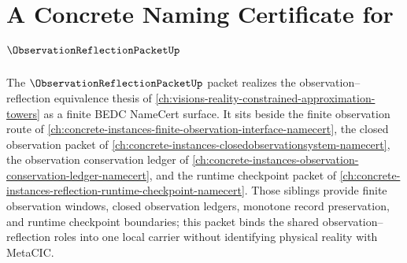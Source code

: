 \chapter{A Concrete Naming Certificate for $\ObservationReflectionPacketUp$}
\label{ch:concrete-instances-observationreflectionpacket-namecert}

The $\ObservationReflectionPacketUp$ packet realizes the observation--reflection equivalence thesis of \autoref{ch:visions-reality-constrained-approximation-towers} as a finite BEDC NameCert surface. It sits beside the finite observation route of \autoref{ch:concrete-instances-finite-observation-interface-namecert}, the closed observation packet of \autoref{ch:concrete-instances-closedobservationsystem-namecert}, the observation conservation ledger of \autoref{ch:concrete-instances-observation-conservation-ledger-namecert}, and the runtime checkpoint packet of \autoref{ch:concrete-instances-reflection-runtime-checkpoint-namecert}. Those siblings provide finite observation windows, closed observation ledgers, monotone record preservation, and runtime checkpoint boundaries; this packet binds the shared observation--reflection roles into one local carrier without identifying physical reality with MetaCIC.

